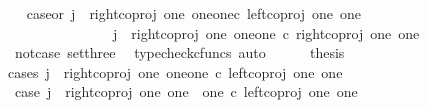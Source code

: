 \begin{isabellebody}
\ \isamarkupfalse%
\ case{}{\isacharunderscore}{\kern0pt}or{\isacharunderscore}{\kern0pt}{}{\isacharcolon}{\kern0pt}\ {\isachardoublequoteopen}j\ {\isacharequal}{\kern0pt}\ right{\isacharunderscore}{\kern0pt}coproj\ one\ {\isacharparenleft}{\kern0pt}one{\isasymCoprod}one{\isacharparenright}{\kern0pt}{\isasymcirc}\isactrlsub c\ left{\isacharunderscore}{\kern0pt}coproj\ one\ one\ {\isasymor}\ \isanewline
\ \ \ \ \ \ \ \ \ \ \ \ \ \ \ j\ {\isacharequal}{\kern0pt}\ right{\isacharunderscore}{\kern0pt}coproj\ one\ {\isacharparenleft}{\kern0pt}one{\isasymCoprod}one{\isacharparenright}{\kern0pt}\ {\isasymcirc}\isactrlsub c\ right{\isacharunderscore}{\kern0pt}coproj\ one\ one{\isachardoublequoteclose}\isanewline
\ \ \ \ \ \ \isamarkupfalse%
\ not{\isacharunderscore}{\kern0pt}case{}\ set{\isacharunderscore}{\kern0pt}three\ \isamarkupfalse%
\ {\isacharparenleft}{\kern0pt}typecheck{\isacharunderscore}{\kern0pt}cfuncs{\isacharcomma}{\kern0pt}\ auto{\isacharparenright}{\kern0pt}\isanewline
\ \ \ \ \isamarkupfalse%
\ {\isacharquery}{\kern0pt}thesis\isanewline
\ \ \ \ \isamarkupfalse%
{\isacharparenleft}{\kern0pt}cases\ {\isachardoublequoteopen}j\ {\isacharequal}{\kern0pt}\ right{\isacharunderscore}{\kern0pt}coproj\ one\ {\isacharparenleft}{\kern0pt}one{\isasymCoprod}one{\isacharparenright}{\kern0pt}\ {\isasymcirc}\isactrlsub c\ left{\isacharunderscore}{\kern0pt}coproj\ one\ one{\isachardoublequoteclose}{\isacharparenright}{\kern0pt}\isanewline
\ \ \ \ \ \ \isamarkupfalse%
\ case{}{\isacharcolon}{\kern0pt}\ {\isachardoublequoteopen}j\ {\isacharequal}{\kern0pt}\ right{\isacharunderscore}{\kern0pt}coproj\ one\ {\isacharparenleft}{\kern0pt}one\ {\isasymCoprod}\ one{\isacharparenright}{\kern0pt}\ {\isasymcirc}\isactrlsub c\ left{\isacharunderscore}{\kern0pt}coproj\ one\ one{\isachardoublequoteclose}\isanewline
\ \ \ \ \ \ \isamarkupfalse%
\ {\isachardoublequoteopen}{\isasymlangle}{\isasymt}{\isacharcomma}{\kern0pt}\ {\isasymf}{\isasymrangle}\ {\isacharequal}{\kern0pt}\ {\isasymlangle}{\isasymt}{\isacharcomma}{\kern0pt}{\isasymt}{\isasymrangle}{\isachardoublequoteclose}\isanewline
\ \ \ \ \ \ \isamarkupfalse%
\ {\isacharminus}{\kern0pt}\ \isanewline
\ \ \ \ \ \ \ \ \isamarkupfalse%

\end{isabellebody}
